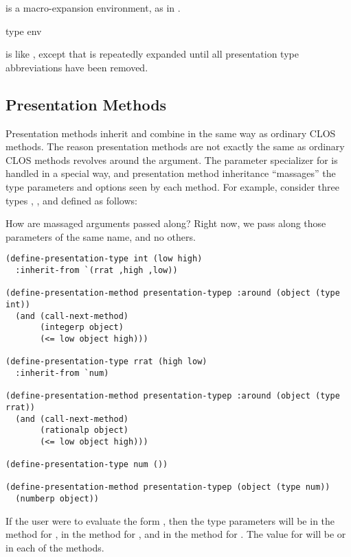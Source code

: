  is a macro-expansion environment, as in .

 {type \optional env}

 is like
, except that  is
repeatedly expanded until all presentation type abbreviations have been removed.


\subsection {Presentation Methods}

Presentation methods inherit and combine in the same way as ordinary CLOS
methods.  The reason presentation methods are not exactly the same as ordinary
CLOS methods revolves around the  argument.  The parameter specializer
for  is handled in a special way, and presentation method inheritance
``massages'' the type parameters and options seen by each method.  For example,
consider three types , , and  defined as follows:

 {How are massaged arguments passed along?  Right now, we pass along
those parameters of the same name, and no others.}

\begin{verbatim}
(define-presentation-type int (low high)
  :inherit-from `(rrat ,high ,low))

(define-presentation-method presentation-typep :around (object (type int))
  (and (call-next-method)
       (integerp object)
       (<= low object high)))

(define-presentation-type rrat (high low)
  :inherit-from `num)

(define-presentation-method presentation-typep :around (object (type rrat))
  (and (call-next-method)
       (rationalp object)
       (<= low object high)))

(define-presentation-type num ())

(define-presentation-method presentation-typep (object (type num))
  (numberp object))
\end{verbatim}

If the user were to evaluate the form ,
then the type parameters will be  in the 
method for ,  in the method for , and  in the
method for .  The value for  will be or  in
each of the methods.


